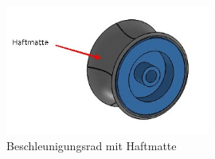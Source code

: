    \begin{figure}[h!]
       	\includegraphics[width=0.6\textwidth,clip,trim=20mm 5mm 0mm 5mm]
       	{Enddokumentation/Bilder/Beschleunigungsrad.JPG}
       	\centering
       	\caption{Beschleunigungsrad mit Haftmatte}
       	\label{abb:BeschleunigungsmasseHaft}
    \end{figure}
